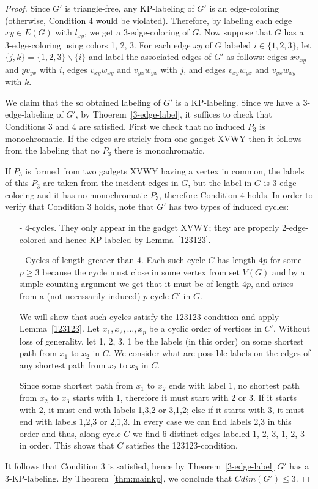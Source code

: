 \documentclass[12pt,a4paper,titlepage,openany]{report}
\begin{document}
\begin{proof}
 Since $G'$ is triangle-free, any KP-labeling of $G'$ is an edge-coloring (otherwise, Condition 4 would be violated). Therefore, by labeling each edge $xy \in E(G)$ with $l_{xy}$, we get a 3-edge-coloring of $G$.\newline
Now suppose that $G$ has a 3-edge-coloring using colors 1, 2, 3. For each edge $xy$ of $G$ labeled $i \in \{1, 2, 3\}$, let $\{j, k\} = \{1, 2, 3\} \backslash \{i\}$ and label the associated edges of $G'$ as follows: edges $xv_{xy}$ and $yv_{yx}$ with $i$, edges $v_{xy} w_{xy}$ and $v_{yx} w_{yx}$ with $j$, and edges $v_{xy} w_{yx}$ and $v_{yx} w_{xy}$ with $k$.

 We claim that the so obtained labeling of $G'$ is a KP-labeling. Since we have a 3-edge-labeling of $G'$, by Thoerem~\ref{3-edge-label}, it suffices to check that Conditions 3 and 4 are satisfied. First we check that no induced $P_3$ is monochromatic. If the edges are stricly from one gadget XVWY then it follows from the labeling that no $P_3$ there is monochromatic. 
 
 If $P_3$ is formed from two gadgets XVWY having a vertex in common, the labels of this $P_3$ are taken from the incident edges in $G$, but the label in $G$ is 3-edge-coloring and it has no monochromatic $P_3$, therefore Condition 4 holds.
In order to verify that Condition 3 holds, note that $G'$ has two types of induced cycles:
\begin{enumerate}
\item[-] 4-cycles. They only appear in the gadget XVWY; they are properly 2-edge-colored and hence KP-labeled by Lemma~\ref{123123}.
\item[-] Cycles of length greater than 4. Each such cycle $C$ has length $4p$ for some $p \geq 3$ because the cycle must close in some vertex from set $V(G)$ and by a simple counting argument we get that it must be of length $4p$, and arises from a (not necessarily induced) $p$-cycle $C'$ in $G$. 

We will show that such cycles satisfy the 123123-condition and apply Lemma~\ref{123123}. Let $x_1, x_2,\ldots, x_p$ be a cyclic order of vertices in $C'$. Without loss of generality, let 1, 2, 3, 1 be the labels (in this order) on some shortest path from $x_1$ to $x_2$ in $C$. We consider what are possible labels on the edges of any shortest path from $x_2$ to $x_3$ in $C$. 

Since some shortest path from $x_1$ to $x_2$ ends with label 1, no shortest path from $x_2$ to $x_3$ starts with 1, therefore it must start with 2 or 3. If it starts with 2, it must end with labels 1,3,2 or 3,1,2; else if it starts with 3, it must end with labels 1,2,3 or 2,1,3. In every case we can find labels 2,3 in this order and thus, along cycle $C$ we find 6 distinct edges labeled 1, 2, 3, 1, 2, 3 in order. This shows that $C$ satisfies the 123123-condition.
\end{enumerate}
It follows that Condition 3 is satisfied, hence by Theorem~\ref{3-edge-label} $G'$ has a 3-KP-labeling. By Theorem~\ref{thm:mainkp}, we conclude that $Cdim(G') \leq 3$.  
\end{proof}
\end{document}
